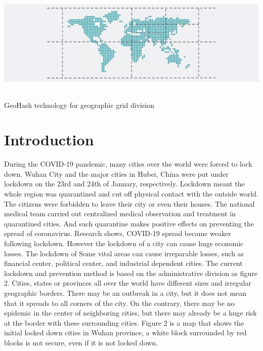 \documentclass[sigplan,screen]{acmart}
\begin{document}

\begin{teaserfigure}
	\centering\includegraphics[height=50mm]{logo.png}
	\caption{GeoHash technology for geographic grid division}
	\label{fig:teaser}
\end{teaserfigure}

\maketitle

\section{Introduction}
During the COVID-19 pandemic, many cities over the world were forced to lock down.
Wuhan City and the major cities in Hubei, China were put under lockdown on the 23rd and 24th of January, respectively\cite{lau2020positive}.
Lockdown meant the whole region was quarantined and cut off physical contact with the outside world.
The citizens were forbidden to leave their city or even their houses.
The national medical team carried out centralized medical observation and treatment in quarantined cities.
And such quarantine makes positive effects on preventing the spread of coronavirus.
Research shows, COVID-19 spread became weaker following lockdown\cite{lau2020positive}.
However the lockdown of a city can cause huge economic losses.
The lockdown of Some vital areas can cause irreparable losses, such as financial center, political center, and industrial dependent cities.
The current lockdown and prevention method is based on the administrative division as figure 2.
Cities, states or provinces all over the world have different sizes and irregular geographic borders.
There may be an outbreak in a city, but it does not mean that it spreads to all corners of the city. On the contrary, there may be no epidemic in the center of neighboring cities, but there may already be a huge risk at the border with these surrounding cities. Figure 2 is a map that shows the initial locked down cities in Wuhan province, a white block surrounded by red blocks is not secure, even if it is not locked down.
\end{document}
